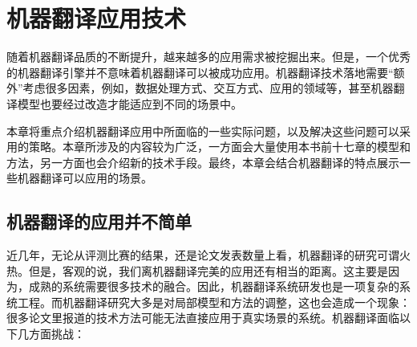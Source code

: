 
%


\renewcommand\figurename{图}%
\renewcommand\tablename{表}%


\chapter{机器翻译应用技术}

\parinterval 随着机器翻译品质的不断提升，越来越多的应用需求被挖掘出来。但是，一个优秀的机器翻译引擎并不意味着机器翻译可以被成功应用。机器翻译技术落地需要“额外”考虑很多因素，例如，数据处理方式、交互方式、应用的领域等，甚至机器翻译模型也要经过改造才能适应到不同的场景中。

\parinterval 本章将重点介绍机器翻译应用中所面临的一些实际问题，以及解决这些问题可以采用的策略。本章所涉及的内容较为广泛，一方面会大量使用本书前十七章的模型和方法，另一方面也会介绍新的技术手段。最终，本章会结合机器翻译的特点展示一些机器翻译可以应用的场景。


\section{机器翻译的应用并不简单}

\parinterval 近几年，无论从评测比赛的结果，还是论文发表数量上看，机器翻译的研究可谓火热。但是，客观的说，我们离机器翻译完美的应用还有相当的距离。这主要是因为，成熟的系统需要很多技术的融合。因此，机器翻译系统研发也是一项复杂的系统工程。而机器翻译研究大多是对局部模型和方法的调整，这也会造成一个现象：很多论文里报道的技术方法可能无法直接应用于真实场景的系统。机器翻译面临以下几方面挑战：

